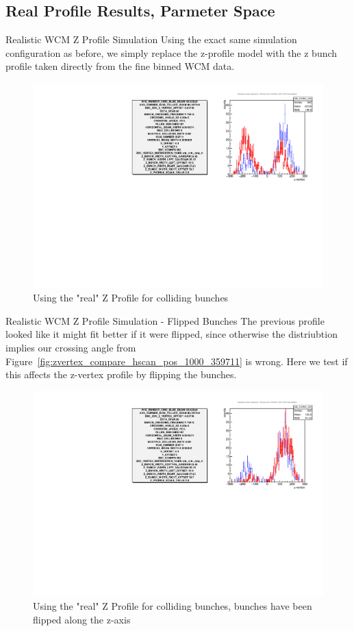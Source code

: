 \subsection{Real Profile Results, Parmeter Space}
\begin{frame}{Realistic WCM Z Profile Simulation}
Using the exact same simulation configuration as before, we simply replace the
z-profile model with the z bunch profile taken directly from the fine binned
WCM data.
\begin{figure}
\begin{center}
\includegraphics[width=0.75\linewidth]{../ZBunchInSimulation/figs/real_wcm_prof_zvertex_compare_hscan_pos_1000_359711.pdf}
\end{center}
\caption{ Using the "real" Z Profile for colliding bunches}
\label{fig:real_wcm_prof_zvertex_compare_hscan_pos_1000_359711}
\end{figure}
\end{frame}

\begin{frame}{Realistic WCM Z Profile Simulation - Flipped Bunches}
The previous profile looked like it might fit better if it were flipped, since
otherwise the distriubtion implies our crossing angle from
Figure~\ref{fig:zvertex_compare_hscan_pos_1000_359711} is wrong. Here we test if
this affects the z-vertex profile by flipping the bunches.
\begin{figure}
\begin{center}
\includegraphics[width=0.75\linewidth]{../ZBunchInSimulation/figs/real_wcm_prof_flipped_zvertex_compare_hscan_pos_1000_359711.pdf}
\end{center}
\caption{ Using the "real" Z Profile for colliding bunches, bunches have been
	flipped along the z-axis}
\label{fig:real_wcm_prof_flipped_zvertex_compare_hscan_pos_1000_359711}
\end{figure}
\end{frame}


